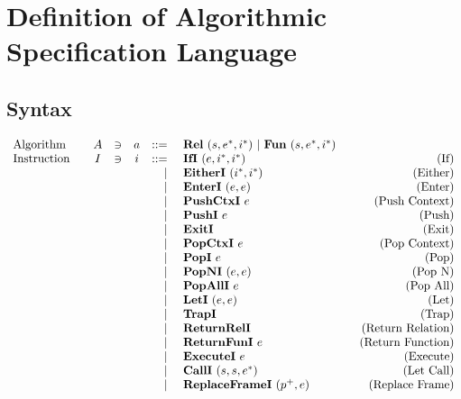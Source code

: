 \section{Definition of Algorithmic Specification Language}
\label{sec:definition}

\newcommand{\seq}[1]{#1^*}

\subsection{Syntax}
\label{syntax}

{
\renewcommand{\arraystretch}{0.97}  %
\begin{align*}
\begin{array}{lcccrlr}
%
  \text{Algorithm}\quad& A &\ni& a &::=& ~ \rel ~ (s, \seq e, \seq i) ~ | ~ \fun ~ (s, \seq e, \seq i) \\
%
  \text{Instruction}\quad& I &\ni& i &::=& ~ \ifi ~ (e, \seq i, \seq i) &\quad\text{(If)} \\
    &&&& | & ~ \eitheri ~ (\seq i, \seq i) &\quad\text{(Either)} \\
    &&&& | & ~ \enteri ~ (e, e) &\quad\text{(Enter)} \\
    &&&& | & ~ \pushctxi ~ e &\quad\text{(Push Context)} \\
    &&&& | & ~ \pushi ~ e &\quad\text{(Push)} \\
    &&&& | & ~ \exiti ~ &\quad\text{(Exit)} \\
    &&&& | & ~ \popctxi ~ e &\quad\text{(Pop Context)} \\
    &&&& | & ~ \popi ~ e &\quad\text{(Pop)} \\
    &&&& | & ~ \popni ~ (e, e) &\quad\text{(Pop N)} \\
    &&&& | & ~ \popalli ~ e &\quad\text{(Pop All)} \\
    &&&& | & ~ \leti ~ (e, e) &\quad\text{(Let)} \\
    &&&& | & ~ \trapi &\quad\text{(Trap)} \\
    &&&& | & ~ \returnreli &\quad\text{(Return Relation)} \\
    &&&& | & ~ \returnfuni ~ e &\quad\text{(Return Function)} \\
    &&&& | & ~ \executei ~ e &\quad\text{(Execute)} \\
    &&&& | & ~ \calli ~ (s, s, \seq{e}) &\quad\text{(Let Call)} \\
    &&&& | & ~ \replaceframei ~ (p^+, e) &\quad\text{(Replace Frame)} \\

\end{array}
\end{align*}}
